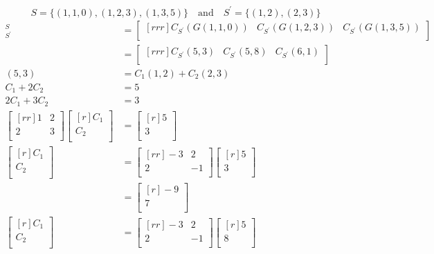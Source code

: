 \documentclass[12pt]{article}
\theoremstyle{definition}
\theoremstyle{plain}
\begin{document}
\begin{enumerate}
\begin{enumerate}
	\[ S=\{(1,1,0),(1,2,3),(1,3,5)\} \quad \mathrm{and} \quad S^\prime = \{(1,2),(2,3)\} \]
		\begin{align*}
		[G]_{S^\prime}^S&=\begin{bmatrix}[rrr]C_{S^\prime}(G(1,1,0)) & C_{S^\prime}(G(1,2,3)) & 		C_{S^\prime}(G(1,3,5))\\\end{bmatrix}\\
		&= \begin{bmatrix}[rrr]C_{S^\prime}(5,3) & C_{S^\prime}(5,8) & C_{S^\prime}(6,1)\\	\end{bmatrix}\\
		(5,3)&=C_1(1,2)+C_2(2,3)\\
		C_1+2C_2&=5\\
		2C_1+3C_2&=3\\
		\begin{bmatrix}[rr]1&2\\2&3\\\end{bmatrix}\begin{bmatrix}[r]C_1\\C_2\\\end{bmatrix}&=	\begin{bmatrix}[r]5\\3\\\end{bmatrix}\\
		\begin{bmatrix}[r]C_1\\C_2\\\end{bmatrix}&=\begin{bmatrix}[rr]-3&2\\2&-1\\	\end{bmatrix}\begin{bmatrix}[r]5\\3\\\end{bmatrix}\\
		&= \begin{bmatrix}[r]-9\\7\\\end{bmatrix}\\
		\begin{bmatrix}[r]C_1\\C_2\\\end{bmatrix}&=\begin{bmatrix}[rr]-3&2\\2&-1\\\end{bmatrix}\begin{bmatrix}[r]5\\8\\\end{bmatrix}\\

\end{align*}
\end{enumerate}
\end{enumerate}
\end{document}

